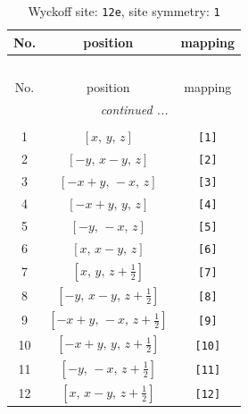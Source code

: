 \documentclass[fleqn,8pt]{jsarticle}
\begin{document}
\renewcommand{\arraystretch}{1.2}
\begin{longtable}{ccc}
\caption{Wyckoff site: {\tt 12e}, site symmetry: {\tt 1}}
 \\
 \hline \hline
No. & position & mapping \\ \hline \endfirsthead

\multicolumn{2}{l}{\tablename\ \thetable{}} \\
 \hline \hline
No. & position & mapping \\ \hline \endhead

 \hline \hline
\multicolumn{2}{r}{\footnotesize\it continued ...} \\ \endfoot

 \hline \hline
\multicolumn{2}{r}{} \\ \endlastfoot

1 & $\left[ x,\, y,\, z \right]$ & {\tt [1]} \\ \hline
2 & $\left[ - y,\, x - y,\, z \right]$ & {\tt [2]} \\ \hline
3 & $\left[ - x + y,\, - x,\, z \right]$ & {\tt [3]} \\ \hline
4 & $\left[ - x + y,\, y,\, z \right]$ & {\tt [4]} \\ \hline
5 & $\left[ - y,\, - x,\, z \right]$ & {\tt [5]} \\ \hline
6 & $\left[ x,\, x - y,\, z \right]$ & {\tt [6]} \\ \hline
7 & $\left[ x,\, y,\, z + \frac{1}{2} \right]$ & {\tt [7]} \\ \hline
8 & $\left[ - y,\, x - y,\, z + \frac{1}{2} \right]$ & {\tt [8]} \\ \hline
9 & $\left[ - x + y,\, - x,\, z + \frac{1}{2} \right]$ & {\tt [9]} \\ \hline
10 & $\left[ - x + y,\, y,\, z + \frac{1}{2} \right]$ & {\tt [10]} \\ \hline
11 & $\left[ - y,\, - x,\, z + \frac{1}{2} \right]$ & {\tt [11]} \\ \hline
12 & $\left[ x,\, x - y,\, z + \frac{1}{2} \right]$ & {\tt [12]} \\
\end{longtable}
\end{document}
